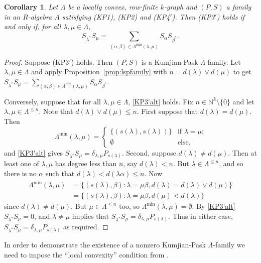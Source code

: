 \documentclass[a4paper,12pt]{amsart}
\numberwithin{equation}{section}
\newtheorem{cor}[thm]{Corollary}
\theoremstyle{definition}
\theoremstyle{remark}
\begin{document}
\begin{cor}\label{cor-altKP3'}
Let $\Lambda$ be a locally convex, row-finite $k$-graph and $(P,S)$
a  family in an $R$-algebra $A$ satisfying (KP1), (KP2) and (KP4$'$). Then (KP3$'$) holds if and 
only if, for all  $\lambda,\mu \in \Lambda$, 
\begin{equation}\label{KP3'alt}
S_{\lambda^{*}}S_\mu=\sum_{(\alpha,\beta)\in\Lambda^{\min}(\lambda,\mu)}
S_\alpha S_{\beta^{*}}.
\end{equation}
\end{cor}

\begin{proof} Suppose (KP3$'$) holds. Then $(P,S)$ is a Kumjian-Pask $\Lambda$-family. 
Let $\lambda,\mu \in \Lambda$ and apply Proposition~\ref{prop:lspfamily} with 
$n=d(\lambda)\vee d(\mu)$ to get 
$S_{\lambda^{*}}S_\mu=\sum_{(\alpha,\beta)\in\Lambda^{\min}(\lambda,\mu)}
S_\alpha S_{\beta^{*}}$. 

Conversely, suppose that for all  $\lambda,\mu \in \Lambda$, \eqref{KP3'alt} holds. 
Fix $n\in{\mathbb{N}}^k\setminus\{0\}$ and let $\lambda,\mu\in\Lambda^{\leq n}$. Note 
that $d(\lambda)\vee d(\mu)\leq n$. First suppose that $d(\lambda)=d(\mu)$. Then
\[
\Lambda^{\min}(\lambda,\mu)=\begin{cases} 
\{(s(\lambda), s(\lambda))\}&\text{if $\lambda=\mu$;}
\\
\emptyset&\text{else,} \end{cases}
\] 
and \eqref{KP3'alt} gives $S_{\lambda^{*}}S_\mu=\delta_{\lambda,\mu}P_{s(\lambda)}$. 
Second, suppose $d(\lambda)\neq d(\mu)$. Then at least one of $\lambda,\mu$ has degree
 less than $n$, say $d(\lambda)<n$. But $\lambda\in\Lambda^{\leq n}$, and so there is
 no $\alpha$ such that $d(\lambda)<d(\lambda\alpha)\leq n$. Now
\begin{align*}
\Lambda^{\min}(\lambda,\mu)&=\{(s(\lambda),\beta):\lambda=\mu\beta, d(\lambda)=d(\lambda)\vee d(\mu)\}\\
&=\{(s(\lambda),\beta):\lambda=\mu\beta, d(\mu)< d(\lambda)\}
\end{align*}
since $d(\lambda)\neq d(\mu)$. But $\mu\in\Lambda^{\leq n}$ too, so $\Lambda^{\min}(\lambda,\mu)=\emptyset$. 
By \eqref{KP3'alt}
$S_{\lambda^*}S_\mu=0$, and $\lambda\neq \mu$ implies that $S_{\lambda^{*}}S_\mu=\delta_{\lambda,\mu}P_{s(\lambda)}$.
Thus in either case, $S_{\lambda^{*}}S_\mu=\delta_{\lambda,\mu}P_{s(\lambda)}$ 
as required.
\end{proof}

In order to demonstrate the existence of a nonzero Kumjian-Pask $\Lambda$-family 
we need to impose the
``local convexity'' condition from \cite{RSY03}.
\end{document}
